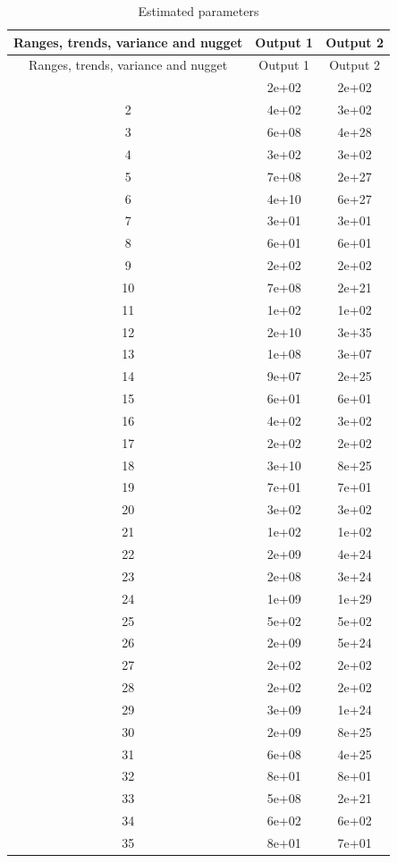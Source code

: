 \documentclass[
  10pt,
]{article}
\begin{document}
\begin{longtable}[]{@{}ccc@{}}
\caption{Estimated parameters}\tabularnewline
\toprule\noalign{}
Ranges, trends, variance and nugget & Output 1 & Output 2 \\
\midrule\noalign{}
\endfirsthead
\toprule\noalign{}
Ranges, trends, variance and nugget & Output 1 & Output 2 \\
\midrule\noalign{}
\endhead
\bottomrule\noalign{}
\endlastfoot
1 & 2e+02 & 2e+02 \\
2 & 4e+02 & 3e+02 \\
3 & 6e+08 & 4e+28 \\
4 & 3e+02 & 3e+02 \\
5 & 7e+08 & 2e+27 \\
6 & 4e+10 & 6e+27 \\
7 & 3e+01 & 3e+01 \\
8 & 6e+01 & 6e+01 \\
9 & 2e+02 & 2e+02 \\
10 & 7e+08 & 2e+21 \\
11 & 1e+02 & 1e+02 \\
12 & 2e+10 & 3e+35 \\
13 & 1e+08 & 3e+07 \\
14 & 9e+07 & 2e+25 \\
15 & 6e+01 & 6e+01 \\
16 & 4e+02 & 3e+02 \\
17 & 2e+02 & 2e+02 \\
18 & 3e+10 & 8e+25 \\
19 & 7e+01 & 7e+01 \\
20 & 3e+02 & 3e+02 \\
21 & 1e+02 & 1e+02 \\
22 & 2e+09 & 4e+24 \\
23 & 2e+08 & 3e+24 \\
24 & 1e+09 & 1e+29 \\
25 & 5e+02 & 5e+02 \\
26 & 2e+09 & 5e+24 \\
27 & 2e+02 & 2e+02 \\
28 & 2e+02 & 2e+02 \\
29 & 3e+09 & 1e+24 \\
30 & 2e+09 & 8e+25 \\
31 & 6e+08 & 4e+25 \\
32 & 8e+01 & 8e+01 \\
33 & 5e+08 & 2e+21 \\
34 & 6e+02 & 6e+02 \\
35 & 8e+01 & 7e+01 \\

\end{longtable}
\end{document}
